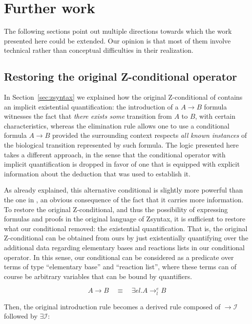 \section{Further work}

The following sections point out multiple directions towards which the work
presented here could be extended. Our opinion is that most of them involve
technical rather than conceptual difficulties in their realization.

\subsection{Restoring the original Z-conditional operator}

In Section~\ref{sec:zsyntax} we explained how the original Z-conditional of
\cite{adding-logic} contains an implicit existential quantification: the
introduction of a $A \rightarrow B$ formula witnesses the fact that \emph{there
  exists some} transition from $A$ to $B$, with certain characteristics, whereas
the elimination rule allows one to use a conditional formula $A \rightarrow B$
provided the surrounding context respects \emph{all known instances} of the
biological transition represented by such formula. The logic presented
here takes a different approach, in the sense that the conditional operator with
implicit quantification is dropped in favor of one that is equipped with
explicit information about the deduction that was used to establish it.

As already explained, this alternative conditional is slightly more powerful
than the one in \cite{adding-logic}, an obvious consequence of the fact that it
carries more information. To restore the original Z-conditional, and thus the
possibility of expressing formulas and proofs in the original language of
Zsyntax, it is sufficient to restore what our conditional removed: the
existential quantification. That is, the original Z-conditional can be obtained
from ours by just existentially quantifying over the additional data regarding
elementary bases and reactions lists in our conditional operator. In this sense,
our conditional can be considered as a predicate over terms of type
``elementary base'' and ``reaction list'', where these terms can of course be
arbitrary variables that can be bound by quantifiers.

\[
  A \rightarrow B \quad \equiv \quad \exists e l . A \rightarrow_l^e B
\]

Then, the original introduction rule becomes a derived rule composed of
$\rightarrow \mathcal{I}$ followed by $\exists \mathcal{I}$:

